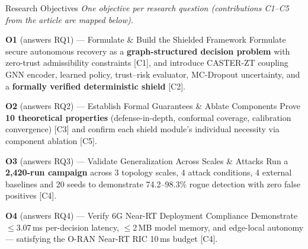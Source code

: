 \documentclass[aspectratio=169,10pt]{beamer}
\begin{document}
\begin{frame}[t,shrink=8]{Research Objectives}{}
  \vspace{0.1cm}
  {\footnotesize\textit{One objective per research question (contributions C1–C5 from the article are mapped below).}}
  \vspace{0.2cm}
  \begin{exampleblock}{\textbf{O1} (answers RQ1) — Formulate \& Build the Shielded Framework}
    Formulate secure autonomous recovery as a \textbf{graph-structured decision problem} with zero-trust admissibility constraints [C1], and introduce CASTER-ZT coupling GNN encoder, learned policy, trust–risk evaluator, MC-Dropout uncertainty, and a \textbf{formally verified deterministic shield} [C2].
  \end{exampleblock}
  \vspace{0.2cm}
  \begin{exampleblock}{\textbf{O2} (answers RQ2) — Establish Formal Guarantees \& Ablate Components}
    Prove \textbf{10 theoretical properties} (defense-in-depth, conformal coverage, calibration convergence) [C3] and confirm each shield module's individual necessity via component ablation [C5].
  \end{exampleblock}
  \vspace{0.2cm}
  \begin{exampleblock}{\textbf{O3} (answers RQ3) — Validate Generalization Across Scales \& Attacks}
    Run a \textbf{2,420-run campaign} across 3 topology scales, 4 attack conditions, 4 external baselines and 20 seeds to demonstrate 74.2–98.3\% rogue detection with zero false positives [C4].
  \end{exampleblock}
  \vspace{0.2cm}
  \begin{exampleblock}{\textbf{O4} (answers RQ4) — Verify 6G Near-RT Deployment Compliance}
    Demonstrate $\le$3.07\,ms per-decision latency, $\le$2\,MB model memory, and edge-local autonomy — satisfying the O-RAN Near-RT RIC 10\,ms budget [C4].
  \end{exampleblock}
\end{frame}
\end{document}
